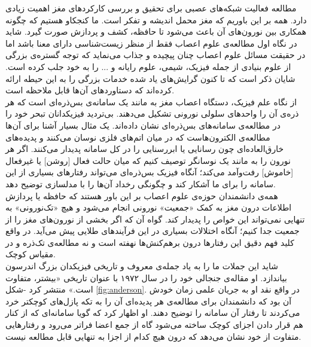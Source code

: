 مطالعه فعالیت شبکه‌های عصبی برای تحقیق و بررسی کارکردهای مغز اهمیت زیادی دارد. همه بر این باوریم که مغز محمل اندیشه و تفکر است. ما کنجکاو هستیم که چگونه همکاری بین نورون‌های آن باعث می‌شود تا حافظه، کشف و پردازش صورت گیرد. شاید در نگاه اول مطالعه‌ی علوم اعصاب فقط از منظر زیست‌شناسی دارای معنا باشد اما در حقیقت مسائل علوم اعصاب چنان پیچیده و جذاب می‌نماید که توجه گستره‌ی بزرگی از علوم بنیادی از جمله فیزیک، شیمی، علوم رایانه و ... را به خود جلب کرده است. شایان ذکر است که تا کنون گرایش‌های یاد شده خدمات بزرگی را به این حیطه‌ ارائه کرده‌اند که دستاوردهای آن‌ها قابل ملاحظه است.\\

از نگاه علم فیزیک، دستگاه اعصاب مغز به مانند یک سامانه‌ی بس‌ذره‌ای است که هر ذره‌ی آن را واحدهای سلولی نورونی تشکیل می‌دهند. بی‌تردید فیزیکدانان تبحر خود را در مطالعه‌ی سامانه‌های بس‌ذره‌ای نشان داده‌اند. یک مثال بسیار آشنا برای آن‌ها مطالعه‌ی الکترون‌هاست که در میان اتم‌های فلزی نوسان می‌کنند و پدیده‌های خارق‌العاده‌ای چون رسانایی یا ابررسنایی را در کل سامانه پدیدار می‌کنند. اگر هر نورون را به مانند یک نوسانگر توصیف کنیم که میان حالت فعال [روشن] یا غیرفعال [خاموش] رفت‌وآمد می‌کند؛ آنگاه فیزیک بس‌ذره‌ای می‌تواند رفتارهای بسیاری از این سامانه را برای ما آشکار کند و چگونگی رخداد آن‌ها را با مدلسازی توضیح دهد.\\

همه‌ی دانشمندان حوزه‌ی علوم اعصاب بر این باور هستند که حافظه یا پردازش اطلاعات درون مغز به کمک «جمعیت» نورونی انجام می‌شود و هیچ «تک‌نورونی» به تنهایی نمی‌تواند این خواص را پدیدار کند. گواه آن که اگر بخشی از نورون‌های مغز را از جمعیت جدا کنیم؛ آنگاه اختلالات بسیاری در این فرآیندهای طلایی پیش می‌آید. در واقع کلید فهم دقیق این رفتارها درون برهم‌کنش‌ها نهفته است و نه مطالعه‌ی تک‌ذره و در مقیاس کوچک.\\

شاید این جملات ما را به یاد جمله‌ی معروف و تاریخی فیزیکدان بزرگ اندرسون بیاندازد. او مقاله‌ی جنجالی خود را در سال ۱۹۷۲ با عنوان تاریخی «بیشتر، متفاوت است.» منتشر کرد -شکل \ref{fig:anderson}. در واقع نقد او به جریان علمی زمان خودش آن بود که دانشمندان برای مطالعه‌ی هر پدیده‌ای آن را به تکه ‌پازل‌های کوچکتر خرد می‌کردند تا رفتار آن سامانه را توضیح دهند. او اظهار کرد که گویا سامانه‌ای که از کنار هم قرار دادن اجزای کوچک ساخته می‌شود گاه از جمع اعضا فراتر می‌رود و رفتارهایی متفاوت از خود نشان می‌دهد که درون هیچ کدام از اجزا به تنهایی قابل مطالعه نیست.\\

